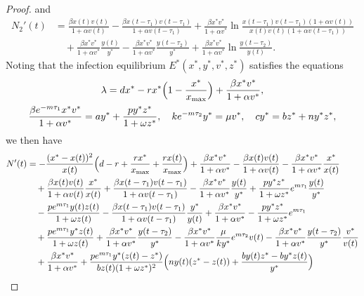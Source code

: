 \documentclass[reqno]{amsart}
\begin{document}
\begin{proof}
and
\begin{align*}
N_{2}'(t)
&= \frac{\beta x(t)v(t)}{1+\alpha v(t)}
 -\frac{\beta x(t-\tau_{1})v(t-\tau_{1})}{1+\alpha v(t-\tau_{1})}
 +\frac{\beta x^{*}v^{*}}{1+\alpha v^{*}}
 \ln\frac{x(t-\tau_{1})v(t-\tau_{1})(1+\alpha v(t))}{x(t)v(t)(1+\alpha v(t-\tau_{1}))}\\
&\quad + \frac{\beta x^{*}v^{*}}{1+\alpha v^{*}}\frac{y(t)}{y^{*}}
-\frac{\beta x^{*}v^{*}}{1+\alpha v^{*}}\frac{y(t-\tau_{2})}{y^{*}}
+\frac{\beta x^{*}v^{*}}{1+\alpha v^{*}}\ln\frac{y(t-\tau_{2})}{y(t)}.
\end{align*}
Noting that the infection equilibrium $E^{*}(x^{*}, y^{*}, v^{*}, z^{*})$ 
satisfies the equations
\begin{gather*}
\lambda=dx^{*}-rx^{*}\Big(1-{\frac{x^{*}}{x_{\rm max}}}\Big)
+{\frac{\beta x^{*}v^{*}}{1+\alpha v^{*}}}, \\
{\frac{\beta e^{-m\tau_1}x^{*}v^{*}}{1+\alpha v^{*}}}=ay^{*}
 +{\frac{py^{*}z^{*}}{1+\omega z^{*}}},\quad
k e^{-m\tau_2}y^{*}=\mu v^{*},\quad
 cy^{*}=bz^{*}+ny^{*}z^{*},
\end{gather*}	
we then have
\begin{align*}
N'(t)
&= -\frac{(x^{*}-x(t))^{2}}{x(t)}\Big(d-r+\frac{rx^{*}}{x_{\rm max}}+\frac{rx(t)}{x_{\rm max}}\Big)
 +\frac{\beta x^{*}v^{*}}{1+\alpha v^{*}}-\frac{\beta x(t)v(t)}{1+\alpha v(t)}
 -\frac{\beta x^{*}v^{*}}{1+\alpha v^{*}}\frac{x^{*}}{x(t)} \\
&\quad +\frac{\beta x(t)v(t)}{1+\alpha v(t)}\frac{x^{*}}{x(t)}
 +\frac{\beta x(t-\tau_{1})v(t-\tau_{1})}{1+\alpha v(t-\tau_{1})}
 -\frac{\beta x^{*}v^{*}}{1+\alpha v^{*}}\frac{y(t)}{y^{*}}
 +\frac{py^{*}z^{*}}{1+\omega z^{*}}e^{m\tau_1}\frac{y(t)}{y^{*}} \\
&\quad -\frac{pe^{m\tau_{1}} y(t)z(t)}{1+\omega z(t)}
 -\frac{\beta x(t-\tau_{1})v(t-\tau_{1})}{1+\alpha v(t-\tau_{1})}\frac{y^{*}}{y(t)}
 +\frac{\beta x^{*}v^{*}}{1+\alpha v^{*}}-\frac{py^{*}z^{*}}{1+\omega z^{*}}e^{m\tau_1} \\
&\quad +\frac{pe^{m\tau_{1}} y^{*}z(t)}{1+\omega z(t)}
 +\frac{\beta x^{*}v^{*}}{1+\alpha v^{*}}\frac{y(t-\tau_{2})}{y^{*}}
 -\frac{\beta x^{*}v^{*}}{1+\alpha v^{*}}\frac{\mu}{ky^{*}}e^{m\tau_2}v(t)
 -\frac{\beta x^{*}v^{*}}{1+\alpha v^{*}}\frac{y(t-\tau_{2})}{y^{*}}\frac{v^{*}}{v(t)} \\
&\quad +\frac{\beta x^{*}v^{*}}{1+\alpha v^{*}}+\frac{pe^{m\tau_1}y^{*}(z(t)
 -z^{*})}{bz(t)(1+\omega z^{*})^{2}}\Big(ny(t)(z^{*}-z(t))+\frac{by(t)z^{*}
 -by^{*}z(t)}{y^{*}}\Big)\\

\end{align*}
\end{proof}
\end{document}

